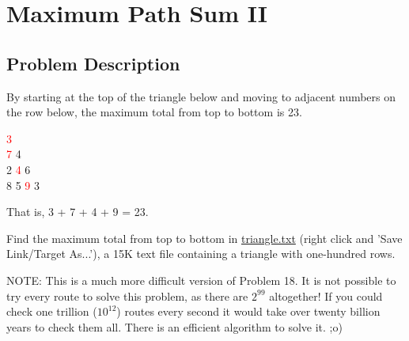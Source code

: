 \section{Maximum Path Sum II}
\subsection{Problem Description}
\begin{tcolorbox}\label{hello}
	By starting at the top of the triangle below and moving to adjacent numbers on the row below, the maximum total from top to bottom is 23.
	\begin{center}
		\textcolor{red}{3}\\
		\textcolor{red}{7} 4\\
		2 \textcolor{red}{4} 6\\
		8 5 \textcolor{red}{9} 3\\
	\end{center}

	That is, 3 + 7 + 4 + 9 = 23.

	Find the maximum total from top to bottom in \href{https://projecteuler.net/resources/documents/0067_triangle.txt}{triangle.txt} (right click and 'Save Link/Target As...'), a 15K text file containing a triangle with one-hundred rows.

	NOTE: This is a much more difficult version of Problem 18. It is not possible to try every route to solve this problem,
	as there are $2^{99}$ altogether! If you could check one trillion ($10^{12}$) routes every second it would take over twenty billion years to check them all. There is an efficient algorithm to solve it. ;o)
\end{tcolorbox}
